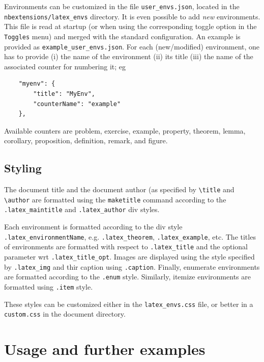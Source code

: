 Environments can be customized in the file \texttt{user\_envs.json},
located in the \texttt{nbextensions/latex\_envs} directory. It is even
possible to add \emph{new} environments. This file is read at startup
(or when using the corresponding toggle option in the \texttt{Toggles}
menu) and merged with the standard configuration. An example is provided
as \texttt{example\_user\_envs.json}. For each (new/modified)
environment, one has to provide (i) the name of the environment (ii) its
title (iii) the name of the associated counter for numbering it; eg

\begin{verbatim}
    "myenv": {
        "title": "MyEnv",
        "counterName": "example"
    },
\end{verbatim}

Available counters are problem, exercise, example, property, theorem,
lemma, corollary, proposition, definition, remark, and figure.

\subsection{Styling}\label{styling}

The document title and the document author (as specified by
\texttt{\textbackslash{}title} and \texttt{\textbackslash{}author} are
formatted using the \texttt{maketitle} command according to the
\texttt{.latex\_maintitle} and \texttt{.latex\_author} div styles.

Each environment is formatted according to the div style
\texttt{.latex\_environmentName}, e.g. \texttt{.latex\_theorem},
\texttt{.latex\_example}, etc. The titles of environments are formatted
with respect to \texttt{.latex\_title} and the optional parameter wrt
\texttt{.latex\_title\_opt}. Images are displayed using the style
specified by \texttt{.latex\_img} and thir caption using
\texttt{.caption}. Finally, enumerate environments are formatted
according to the \texttt{.enum} style. Similarly, itemize environments
are formatted using \texttt{.item} style.

These styles can be customized either in the \texttt{latex\_envs.css}
file, or better in a \texttt{custom.css} in the document directory.

    \section{Usage and further examples}\label{usage-and-further-examples}

